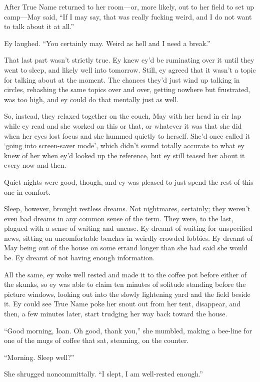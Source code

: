 After True Name returned to her room—or, more likely, out to her field to set up camp—May said, ``If I may say, that was really fucking weird, and I do not want to talk about it at all.''

Ey laughed. ``You certainly may. Weird as hell and I need a break.''

That last part wasn't strictly true. Ey knew ey'd be ruminating over it until they went to sleep, and likely well into tomorrow. Still, ey agreed that it wasn't a topic for talking about at the moment. The chances they'd just wind up talking in circles, rehashing the same topics over and over, getting nowhere but frustrated, was too high, and ey could do that mentally just as well.

So, instead, they relaxed together on the couch, May with her head in eir lap while ey read and she worked on this or that, or whatever it was that she did when her eyes lost focus and she hummed quietly to herself. She'd once called it `going into screen-saver mode', which didn't sound totally accurate to what ey knew of her when ey'd looked up the reference, but ey still teased her about it every now and then.

Quiet nights were good, though, and ey was pleased to just spend the rest of this one in comfort.

Sleep, however, brought restless dreams. Not nightmares, certainly; they weren't even bad dreams in any common sense of the term. They were, to the last, plagued with a sense of waiting and unease. Ey dreamt of waiting for unspecified news, sitting on uncomfortable benches in weirdly crowded lobbies. Ey dreamt of May being out of the house on some errand longer than she had said she would be. Ey dreamt of not having enough information.

All the same, ey woke well rested and made it to the coffee pot before either of the skunks, so ey was able to claim ten minutes of solitude standing before the picture windows, looking out into the slowly lightening yard and the field beside it. Ey could see True Name poke her snout out from her tent, disappear, and then, a few minutes later, start trudging her way back toward the house.

``Good morning, Ioan. Oh good, thank you,'' she mumbled, making a bee-line for one of the mugs of coffee that sat, steaming, on the counter.

``Morning. Sleep well?''

She shrugged noncommittally. ``I slept, I am well-rested enough.''

